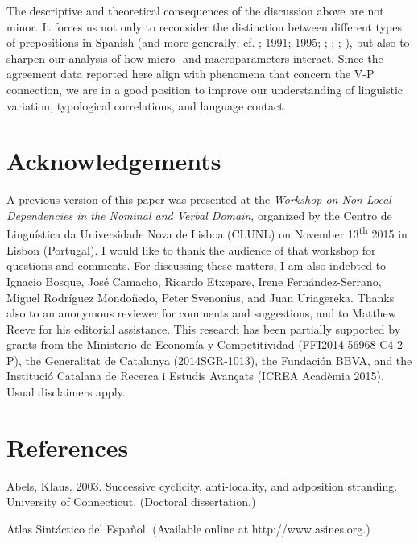 \documentclass[output=paper]{langsci/langscibook}
\begin{document}
\begin{styleHTMLPreformatted}
The descriptive and theoretical consequences of the discussion above are not minor. It forces us not only to reconsider the distinction between different types of prepositions in Spanish (and more generally; cf. \citealt{Demonte1987}; 1991; 1995; \citealt{Abels2003}; \citealt{Cuervo2003}; \citet{Pesetsky2004}; \citealt{Romero2011}), but also to sharpen our analysis of how micro- and macroparameters interact. Since the agreement data reported here align with phenomena that concern the V-P connection, we are in a good position to improve our understanding of linguistic variation, typological correlations, and language contact.
\end{styleHTMLPreformatted}

\section{ Acknowledgements}

\begin{styleHTMLPreformatted}
A previous version of this paper was presented at the \textit{Workshop on Non-Local Dependencies in the Nominal and Verbal Domain}, organized by the Centro de Linguística da Universidade Nova de Lisboa (CLUNL) on November 13\textsuperscript{th} 2015 in Lisbon (Portugal). I would like to thank the audience of that workshop for questions and comments. For discussing these matters, I am also indebted to Ignacio Bosque, José Camacho, Ricardo Etxepare, Irene Fernández-Serrano, Miguel Rodríguez Mondoñedo, Peter Svenonius, and Juan Uriagereka. Thanks also to an anonymous reviewer for comments and suggestions, and to Matthew Reeve for his editorial assistance. This research has been partially supported by grants from the Ministerio de Economía y Competitividad (FFI2014-56968-C4-2-P), the Generalitat de Catalunya (2014SGR-1013), the Fundación BBVA, and the Institució Catalana de Recerca i Estudis Avançats (ICREA Acadèmia 2015). Usual disclaimers apply.
\end{styleHTMLPreformatted}

\section{ References}

Abels, Klaus. 2003. Successive cyclicity, anti-locality, and adposition stranding. University of Connecticut. (Doctoral dissertation.)

Atlas Sintáctico del Español. (Available online at http://www.asines.org.)
\end{document}
